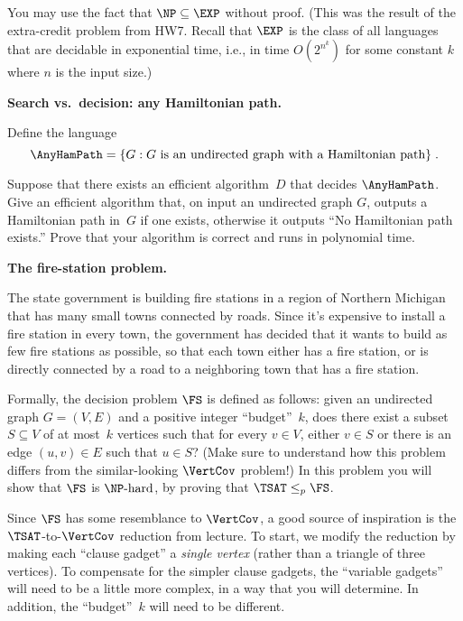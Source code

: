 \documentclass[11pt,addpoints]{exam}
\newcommand{\NPhard}{\NP\text{-hard}}
\begin{document}
\begin{questions}
  You may use the fact that $\NP\subseteq\EXP$ without proof.
  (This was the result of the extra-credit problem from HW7.
  Recall that $\EXP$ is the class of all languages that are decidable in exponential time, i.e., in time $O(2^{n^k})$ for some constant $k$ where $n$ is the input size.)
   
  \begin{solution}

  \end{solution}

  \pagebreak
  
  \question[16] \textbf{Search vs.\ decision: any Hamiltonian path.}

  Define the language
  \[
    \AnyHamPath = \set{G : G \text{ is an undirected graph with a Hamiltonian path}} \; \text.
  \]
  
  Suppose that there exists an efficient algorithm~$D$ that decides $\AnyHamPath$.
  Give an efficient algorithm that, on input an undirected graph $G$, outputs a Hamiltonian path in~$G$ if one exists, otherwise it outputs ``No Hamiltonian path exists.''
  Prove that your algorithm is correct and runs in polynomial time.

  \begin{solution}

  \end{solution}

  \question[20] \textbf{The fire-station problem.}
  
  The state government is building fire stations in a region of Northern Michigan that has many small towns connected by roads.
  Since it's expensive to install a fire station in every town, the government has decided that it wants to build as few fire stations as possible, so that each town either has a fire station, or is directly connected by a road to a neighboring town that has a fire station.

  Formally, the decision problem $\FS$ is defined as follows: given an undirected graph $G=(V,E)$ and a positive integer ``budget''~$k$, does there exist a subset $S \subseteq V$ of at most~$k$ vertices such that for every $v \in V$, either $v \in S$ or there is an edge $(u,v) \in E$ such that $u \in S$?
  (Make sure to understand how this problem differs from the similar-looking $\VertCov$ problem!)
  In this problem you will show that $\FS$ is $\NPhard$, by proving that $\TSAT \leq_p \FS$.
    
  Since $\FS$ has some resemblance to $\VertCov$, a good source of inspiration is the $\TSAT$-to-$\VertCov$ reduction from lecture.
  To start, we modify the reduction by making each ``clause gadget'' a \emph{single vertex} (rather than a triangle of three vertices).
  To compensate for the simpler clause gadgets, the ``variable gadgets'' will need to be a little more complex, in a way that you will determine.
  In addition, the ``budget''~$k$ will need to be different.


\end{questions}
\end{document}
